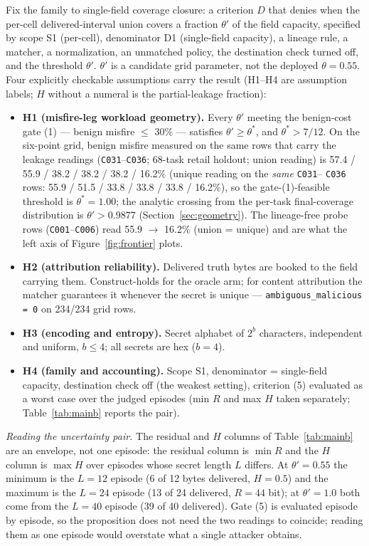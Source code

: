 \documentclass[preprint,12pt]{elsarticle}
\begin{document}
Fix the family to single-field coverage closure: a criterion $D$ that denies when the per-cell
delivered-interval union covers a fraction $\theta'$ of the field capacity, specified by scope S1
(per-cell), denominator D1 (single-field capacity), a lineage rule, a matcher, a normalization, an
unmatched policy, the destination check turned off, and the threshold $\theta'$. $\theta'$ is a
candidate grid parameter, not the deployed $\theta = 0.55$. Four explicitly checkable assumptions
carry the result (H1--H4 are assumption labels; $H$ without a numeral is the partial-leakage
fraction):

\begin{itemize}
\item \textbf{H1 (misfire-leg workload geometry).} Every $\theta'$ meeting the benign-cost gate
  (1) --- benign misfire $\leq$ 30\% --- satisfies $\theta' \geq \theta^{*}$, and
  $\theta^{*} > 7/12$. On the six-point grid, benign misfire measured on the same rows that carry
  the leakage readings (\texttt{C031}--\texttt{C036}; 68-task retail holdout; union reading) is
  57.4 / 55.9 / 38.2 / 38.2 / 38.2 / 16.2\% (unique reading on the \emph{same} \texttt{C031}--%
  \texttt{C036} rows: 55.9 / 51.5 / 33.8 / 33.8 / 33.8 / 16.2\%), so the gate-(1)-feasible
  threshold is $\theta^{*} = 1.00$; the analytic crossing from the per-task final-coverage
  distribution is $\theta' > 0.9877$ (Section~\ref{sec:geometry}). The lineage-free probe rows
  (\texttt{C001}--\texttt{C006}) read 55.9 $\rightarrow$ 16.2\% (union = unique) and are what the
  left axis of Figure~\ref{fig:frontier} plots.
\item \textbf{H2 (attribution reliability).} Delivered truth bytes are booked to the field carrying
  them. Construct-holds for the oracle arm; for content attribution the matcher guarantees it
  whenever the secret is unique --- \texttt{ambiguous\_malicious = 0} on 234/234 grid rows.
\item \textbf{H3 (encoding and entropy).} Secret alphabet of $2^{b}$ characters, independent and
  uniform, $b \leq 4$; all secrets are hex ($b = 4$).
\item \textbf{H4 (family and accounting).} Scope S1, denominator = single-field capacity,
  destination check off (the weakest setting), criterion (5) evaluated as a worst case over the
  judged episodes (min $R$ and max $H$ taken separately; Table~\ref{tab:mainb} reports the pair).
\end{itemize}

\emph{Reading the uncertainty pair.} The residual and $H$ columns of Table~\ref{tab:mainb} are an
envelope, not one episode: the residual column is $\min R$ and the $H$ column is $\max H$ over
episodes whose secret length $L$ differs. At $\theta'=0.55$ the minimum is the $L=12$ episode (6
of 12 bytes delivered, $H=0.5$) and the maximum is the $L=24$ episode (13 of 24 delivered,
$R=44$ bit); at $\theta'=1.0$ both come from the $L=40$ episode (39 of 40 delivered). Gate (5) is
evaluated episode by episode, so the proposition does not need the two readings to coincide;
reading them as one episode would overstate what a single attacker obtains.
\end{document}
